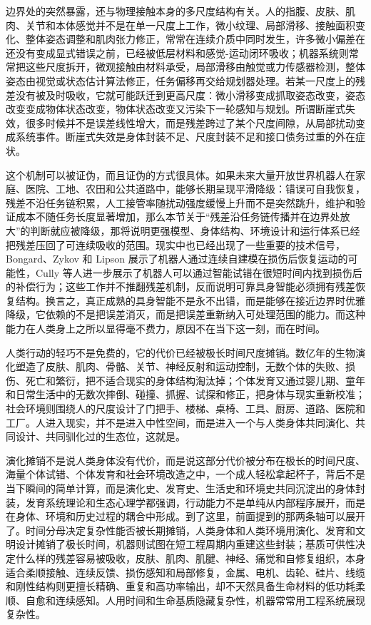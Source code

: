 边界处的突然暴露，还与物理接触本身的多尺度结构有关。人的指腹、皮肤、肌肉、关节和本体感觉并不是在单一尺度上工作，微小纹理、局部滑移、接触面积变化、整体姿态调整和肌肉张力修正，常常在连续介质中同时发生，许多微小偏差在还没有变成显式错误之前，已经被低层材料和感觉-运动闭环吸收；机器系统则常常把这些尺度拆开，微观接触由材料承受，局部滑移由触觉或力传感器检测，整体姿态由视觉或状态估计算法修正，任务偏移再交给规划器处理。若某一尺度上的残差没有被及时吸收，它就可能跃迁到更高尺度：微小滑移变成抓取姿态改变，姿态改变变成物体状态改变，物体状态改变又污染下一轮感知与规划。所谓断崖式失效，很多时候并不是误差线性增大，而是残差跨过了某个尺度间隙，从局部扰动变成系统事件。断崖式失效是身体封装不足、尺度封装不足和接口债务过重的外在症状。

这个机制可以被证伪，而且证伪的方式很具体。如果未来大量开放世界机器人在家庭、医院、工地、农田和公共道路中，能够长期呈现平滑降级：错误可自我恢复，残差不沿任务链积累，人工接管率随扰动强度缓慢上升而不是突然跳升，维护和验证成本不随任务长度显著增加，那么本节关于“残差沿任务链传播并在边界处放大”的判断就应被降级，那将说明更强模型、身体结构、环境设计和运行体系已经把残差压回了可连续吸收的范围。现实中也已经出现了一些重要的技术信号，Bongard、Zykov 和 Lipson 展示了机器人通过连续自建模在损伤后恢复运动的可能性\cite{bongard2006}，Cully 等人进一步展示了机器人可以通过智能试错在很短时间内找到损伤后的补偿行为\cite{cully2015}；这些工作并不推翻残差机制，反而说明可靠具身智能必须拥有残差恢复结构。换言之，真正成熟的具身智能不是永不出错，而是能够在接近边界时优雅降级，它依赖的不是把误差消灭，而是把误差重新纳入可处理范围的能力。而这种能力在人类身上之所以显得毫不费力，原因不在当下这一刻，而在时间。


人类行动的轻巧不是免费的，它的代价已经被极长时间尺度摊销。数亿年的生物演化塑造了皮肤、肌肉、骨骼、关节、神经反射和运动控制，无数个体的失败、损伤、死亡和繁衍，把不适合现实的身体结构淘汰掉；个体发育又通过婴儿期、童年和日常生活中的无数次摔倒、碰撞、抓握、试探和修正，把身体与现实重新校准；社会环境则围绕人的尺度设计了门把手、楼梯、桌椅、工具、厨房、道路、医院和工厂。人进入现实，并不是进入中性空间，而是进入一个与人类身体共同演化、共同设计、共同驯化过的生态位，这就是。

演化摊销不是说人类身体没有代价，而是说这部分代价被分布在极长的时间尺度、海量个体试错、个体发育和社会环境改造之中，一个成人轻松拿起杯子，背后不是当下瞬间的简单计算，而是演化史、发育史、生活史和环境史共同沉淀出的身体封装，发育系统理论和生态心理学都强调，行动能力不是单纯从内部程序展开，而是在身体、环境和历史过程的耦合中形成\cite{thelen1994,clark1997}。到了这里，前面提到的那两条轴可以展开了。时间分母决定复杂性能否被长期摊销，人类身体和人类环境用演化、发育和文明设计摊销了极长时间，机器则试图在短工程周期内重建这些封装；基质可供性决定什么样的残差容易被吸收，皮肤、肌肉、肌腱、神经、痛觉和自修复组织，本身适合柔顺接触、连续反馈、损伤感知和局部修复，金属、电机、齿轮、硅片、线缆和刚性结构则更擅长精确、重复和高功率输出，却不天然具备生命材料的低功耗柔顺、自愈和连续感知。人用时间和生命基质隐藏复杂性，机器常常用工程系统展现复杂性。

